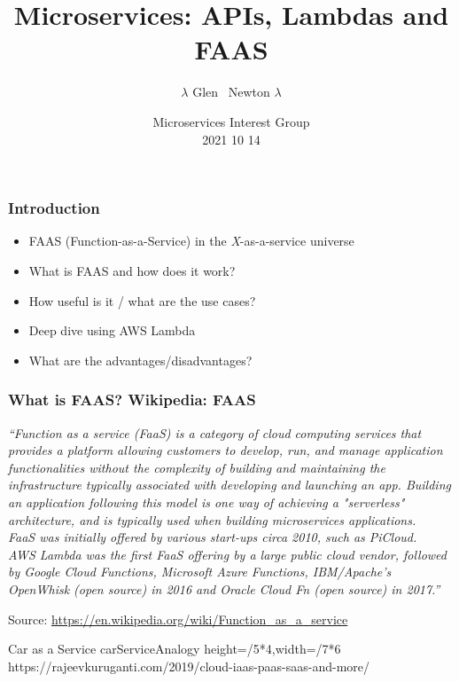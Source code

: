 \documentclass[11pt,aspectratio=169]{beamer}
\title[Crisis] %
{Microservices: APIs, Lambdas and FAAS}
\author[Newton] %
{$\lambda$ Glen ~Newton $\lambda$ }
\institute[Dept This and That] %
{
  Section Head, Scientific Computing\\
  Geological Survey of Canada\\
  Natural Resources Canada
}
\date[2021 10 14] %
     {Microservices Interest Group\\
     2021 10 14}
\begin{document}
\nrcanTitleframe

  
\begin{nrcanFrame}
  \frametitle{Introduction}
  \begin{itemize}
  \item FAAS (Function-as-a-Service) in the \textit{X}-as-a-service universe
  \item What is FAAS and how does it work?
  \item How useful is it / what are the use cases?
  \item Deep dive using AWS Lambda
  \item What are the advantages/disadvantages?

    \end{itemize}
\end{nrcanFrame}

\begin{nrcanFrame}
  \frametitle{What is FAAS? Wikipedia: FAAS}
  \textit{``Function as a service (FaaS) is a category of cloud
    computing services that provides a platform allowing customers to
    develop, run, and manage application functionalities \alert{without the
    complexity of building and maintaining the infrastructure
    typically associated with developing and launching an app}.
    Building an application following this model is one way of
    achieving a "serverless" architecture, and is typically used when
    building \alert{microservices} applications.  
\\
      \vspace*{2mm}
      FaaS was initially offered by various start-ups circa 2010, such
      as PiCloud. 
      \\
\vspace{2mm}
AWS \alert{Lambda} was the first FaaS offering by a large public cloud
vendor, followed by Google \alert{Cloud Functions}, Microsoft \alert{Azure Functions},
IBM/Apache's OpenWhisk (open source) in 2016 and Oracle Cloud Fn (open
source) in 2017.'' 
}

  {\tiny Source: \url{https://en.wikipedia.org/wiki/Function_as_a_service}}
\end{nrcanFrame}
    
\nrcanGraphicFrame
  {Car as a Service}
  {carServiceAnalogy}
  {height=\paperheight/5*4,width=\paperwidth/7*6}
  {https://rajeevkuruganti.com/2019/cloud-iaas-paas-saas-and-more/}
\end{document}
